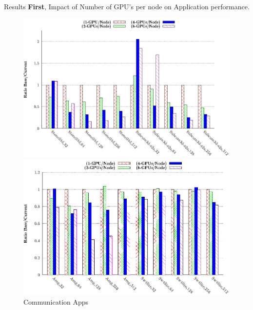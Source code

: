 \documentclass[final]{beamer}
\newlength{\onecolwid}
\newlength{\twocolwid}
\begin{document}
\begin{frame}[t]
\begin{columns}[t]
\begin{column}{\twocolwid}
\begin{columns}[t,totalwidth=\twocolwid]
\end{columns} %


\begin{columns}[t,totalwidth=\twocolwid] %

\begin{column}{\onecolwid} %
\vspace{-1em}
\vspace{-2.5em}
\begin{block}{Results}
\textbf{First}, Impact of Number of GPU's per node on Application performance. 
\begin{figure}
\centering
\begin{minipage}{.45\textwidth}
\centering
\includegraphics[width=1\linewidth]{figs/dfly-x-mapping-comm.eps}
\captionsetup{labelformat=empty}
\caption{Communication Apps}
\label{fig:13a}
\end{minipage}
\begin{minipage}{.45\textwidth}
\centering
\includegraphics[width=1\linewidth]{figs/dfly-x-mapping-comp-new.eps}

\end{minipage}
\end{figure}
\end{block}
\end{column}
\end{columns}
\end{column}
\end{columns}
\end{frame}
\end{document}
